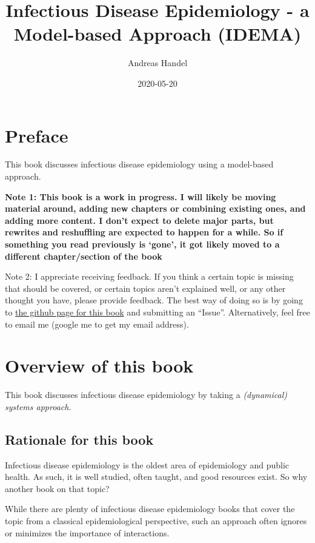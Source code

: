 \documentclass[
]{book}
\title{Infectious Disease Epidemiology - a Model-based Approach (IDEMA)}
\author{Andreas Handel}
\date{2020-05-20}
\begin{document}
\maketitle

{
\setcounter{tocdepth}{1}
\tableofcontents
}
\hypertarget{preface}{%
\chapter*{Preface}\label{preface}}

This book discusses infectious disease epidemiology using a model-based approach.

\textbf{Note 1: This book is a work in progress. I will likely be moving material around, adding new chapters or combining existing ones, and adding more content. I don't expect to delete major parts, but rewrites and reshuffling are expected to happen for a while. So if something you read previously is `gone', it got likely moved to a different chapter/section of the book}

Note 2: I appreciate receiving feedback. If you think a certain topic is missing that should be covered, or certain topics aren't explained well, or any other thought you have, please provide feedback. The best way of doing so is by going to \href{https://github.com/andreashandel/IDEMAbook}{the github page for this book} and submitting an ``Issue''. Alternatively, feel free to email me (google me to get my email address).

\hypertarget{overview-of-this-book}{%
\chapter{Overview of this book}\label{overview-of-this-book}}

This book discusses infectious disease epidemiology by taking a \emph{(dynamical) systems approach}.

\hypertarget{rationale-for-this-book}{%
\section{Rationale for this book}\label{rationale-for-this-book}}

Infectious disease epidemiology is the oldest area of epidemiology and public health. As such, it is well studied, often taught, and good resources exist. So why another book on that topic?

While there are plenty of infectious disease epidemiology books that cover the topic from a classical epidemiological perspective, such an approach often ignores or minimizes the importance of interactions.
\end{document}
